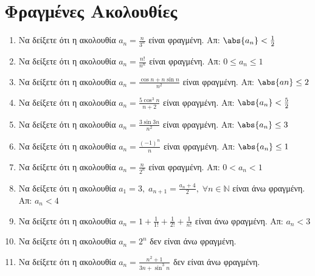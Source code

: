 


\everymath{\displaystyle}



\begin{center}
\end{center}

\vspace{\baselineskip}


\setcounter{chapter}{1}
\section{Φραγμένες Ακολουθίες}

\begin{enumerate}
    \item Να δείξετε ότι η ακολουθία $ a_{n} = \frac{n}{3^{n}} $ είναι 
        φραγμένη. 
        \hfill Απ: $ \abs{a_{n}}< \frac{1}{2} $
    \item Να δείξετε ότι η ακολουθία $ a_{n} = \frac{n!}{n^{n}} $ είναι 
        φραγμένη. 
        \hfill Απ: $ 0 \leq a_{n} \leq 1 $ 
    \item Να δείξετε ότι η ακολουθία $ a_{n} = \frac{\cos{n} + n 
        \sin{n}}{n^{2}} $ είναι φραγμένη. 
        \hfill Απ: $ \abs{an} \leq 2 $ 
    \item Να δείξετε ότι η ακολουθία $ a_{n} = \frac{5 \cos^{3}{n}}{n+2} $ 
        είναι φραγμένη.
        \hfill Απ: $ \abs{a_{n}} < \frac{5}{2}  $ 
    \item Να δείξετε ότι η ακολουθία $ a_{n} = \frac{3 \sin{3n}}{n^{2}} $ 
        είναι φραγμένη.
        \hfill Απ: $ \abs{a_{n}} \leq 3 $ 
    \item Να δείξετε ότι η ακολουθία $ a_{n} = \frac{(-1)^{n}}{n} $ είναι 
        φραγμένη.
        \hfill Απ: $ \abs{a_{n}} \leq 1 $ 
    \item Να δείξετε ότι η ακολουθία $ a_{n} = \frac{n}{2^{n}}  $ είναι 
        φραγμένη.
        \hfill Απ: $ 0 < a_{n} < 1 $ 
    \item Να δείξετε ότι η ακολουθία $ a_{1} = 3, \; a_{n+1} =
        \frac{a_{n}+4}{2}, \; \forall n \in \mathbb{N} $ είναι άνω φραγμένη.
        \hfill Απ: $ a_{n} < 4 $ 
    \item Να δείξετε ότι η ακολουθία $ a_{n} = 1 + \frac{1}{1!} +
        \frac{1}{2!} + \frac{1}{n!} $ είναι άνω φραγμένη.
        \hfill Απ: $ a_{n} < 3 $ 
    \item Να δείξετε ότι η ακολουθία $ a_{n} = 2^{n} $ δεν είναι άνω 
        φραγμένη.
    \item Να δείξετε ότι η ακολουθία $ a_{n} = \frac{n^{2}+1}{3n+ 
        \sin^{3}{n}} $
        δεν είναι άνω 
        φραγμένη.
\end{enumerate}

